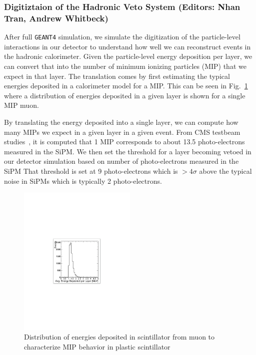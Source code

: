 \subsubsection{Digitiztaion of the Hadronic Veto System (Editors: Nhan Tran, Andrew Whitbeck)}
\label{sec:hcaldig}

After full {\tt GEANT4} simulation, we simulate the digitization of the particle-level interactions in our detector to understand how well we can reconstruct events in the hadronic calorimeter.
Given the particle-level energy deposition per layer, we can convert that into the number of minimum ionizing particles (MIP) that we expect in that layer.
The translation comes by first estimating the typical energies deposited in a calorimeter model for a MIP.  
This can be seen in Fig.~\ref{fig:hcalMIP} where a distribution of energies deposited in a given layer is shown for a single MIP muon.

By translating the energy deposited into a single layer, we can compute how many MIPs we expect in a given layer in a given event.  
From CMS testbeam studies~\cite{}, it is computed that 1 MIP corresponds to about 13.5 photo-electrons measured in the SiPM.
We then set the threshold for a layer becoming vetoed in our detector simulation based on number of photo-electrons measured in the SiPM
That threshold is set at 9 photo-electrons which is $> 4\sigma$ above the typical noise in SiPMs which is typically 2 photo-electrons.

\begin{figure}[hbtp]
\begin{center}
    \includegraphics[width=0.5\textwidth]{images/hcal_mip.pdf}
    \caption{Distribution of energies deposited in scintillator from muon to characterize MIP behavior in plastic scintillator}
 \label{fig:hcalMIP}
 \end{center}
\end{figure}
